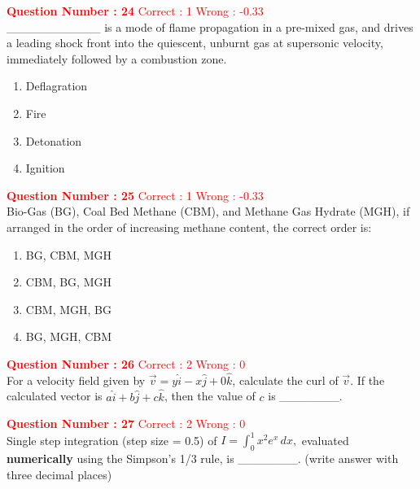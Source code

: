 \documentclass[12pt]{article}
\begin{document}
{\textbf{\textcolor{red}{Question Number : 24}} \hfill \textcolor{red}{Correct : 1 \quad Wrong : -0.33} \\[1ex]
\_\_\_\_\_\_\_\_\_\_\_ is a mode of flame propagation in a pre-mixed gas, and drives a leading shock front into the quiescent, unburnt gas at supersonic velocity, immediately followed by a combustion zone.

\begin{enumerate}[label=(\Alph*)]
    \item Deflagration
    \item Fire
    \item Detonation
    \item Ignition
\end{enumerate}

\vspace{2ex}

\textbf{\textcolor{red}{Question Number : 25}} \hfill \textcolor{red}{Correct : 1  Wrong : -0.33} \\[1ex]
Bio-Gas (BG), Coal Bed Methane (CBM), and Methane Gas Hydrate (MGH), if arranged in the order of increasing methane content, the correct order is:

\begin{enumerate}[label=(\Alph*)]
    \item BG, CBM, MGH
    \item CBM, BG, MGH
    \item CBM, MGH, BG
    \item BG, MGH, CBM
\end{enumerate}

\vspace{2ex}

\textbf{\textcolor{red}{Question Number : 26}} \hfill \textcolor{red}{Correct : 2  Wrong : 0} \\[1ex]
For a velocity field given by $\vec{v} = y \hat{i} - x \hat{j} + 0 \hat{k}$, calculate the curl of $\vec{v}$. If the calculated vector is $a \hat{i} + b \hat{j} + c \hat{k}$, then the value of $c$ is \_\_\_\_\_\_\_.

\vspace{3ex}

\newpage

\textbf{\textcolor{red}{Question Number : 27}} \hfill \textcolor{red}{Correct : 2  Wrong : 0} \\[1ex]
Single step integration (step size = 0.5) of 
$ 
I = \int_0^1 x^2 e^x \, dx,
$
evaluated \textbf{numerically} using the Simpson’s 1/3 rule, is \_\_\_\_\_\_\_. (write answer with three decimal places)


}
\end{document}
